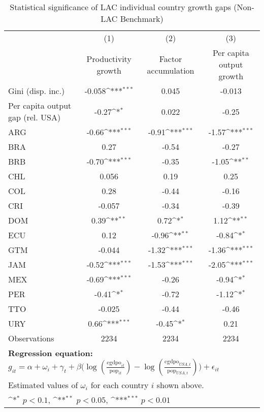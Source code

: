 \begin{table}[htbp]\centering
\def\sym#1{\ifmmode^{#1}\else\(^{#1}\)\fi}
\caption{Statistical significance of LAC individual country growth gaps (Non-LAC Benchmark)}
\begin{tabular}{l*{3}{c}}
\toprule
                &\multicolumn{1}{c}{(1)}&\multicolumn{1}{c}{(2)}&\multicolumn{1}{c}{(3)}\\
                &\multicolumn{1}{c}{Productivity growth}&\multicolumn{1}{c}{Factor accumulation}&\multicolumn{1}{c}{Per capita output growth}\\
\midrule
Gini (disp. inc.)&   -0.058\sym{***}&    0.045         &   -0.013         \\
Per capita output gap (rel. USA)&    -0.27\sym{*}  &    0.022         &    -0.25         \\
ARG             &    -0.66\sym{***}&    -0.91\sym{***}&    -1.57\sym{***}\\
BRA             &     0.27         &    -0.54         &    -0.27         \\
BRB             &    -0.70\sym{***}&    -0.35         &    -1.05\sym{**} \\
CHL             &    0.056         &     0.19         &     0.25         \\
COL             &     0.28         &    -0.44         &    -0.16         \\
CRI             &   -0.057         &    -0.34         &    -0.39         \\
DOM             &     0.39\sym{**} &     0.72\sym{*}  &     1.12\sym{**} \\
ECU             &     0.12         &    -0.96\sym{**} &    -0.84\sym{*}  \\
GTM             &   -0.044         &    -1.32\sym{***}&    -1.36\sym{***}\\
JAM             &    -0.52\sym{***}&    -1.53\sym{***}&    -2.05\sym{***}\\
MEX             &    -0.69\sym{***}&    -0.26         &    -0.94\sym{*}  \\
PER             &    -0.41\sym{*}  &    -0.72         &    -1.12\sym{*}  \\
TTO             &   -0.025         &    -0.44         &    -0.46         \\
URY             &     0.66\sym{***}&    -0.45\sym{*}  &     0.21         \\
\midrule
Observations    &     2234         &     2234         &     2234         \\
\bottomrule
\multicolumn{4}{l}{\footnotesize \textbf{Regression equation:} \(g_{it} = \alpha  + \omega_i + \gamma_t + \beta \big(\log (\frac{\textrm{cgdpo}_{it}}{\textrm{pop}_{it}} ) - \log (\frac{\textrm{cgdpo}_{USA,t}}{\textrm{pop}_{USA,t}}  ) \big) + \epsilon_{it}\)}\\
\multicolumn{4}{l}{\footnotesize Estimated values of \(\omega_i\) for each country \(i\) shown above.}\\
\multicolumn{4}{l}{\footnotesize \sym{*} \(p<0.1\), \sym{**} \(p<0.05\), \sym{***} \(p<0.01\)}\\
\end{tabular}
\end{table}
